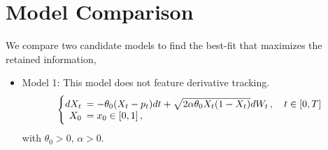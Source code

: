\documentclass[11pt]{article}
\theoremstyle{definition}
\begin{document}
\section{Model Comparison} \label{Section_5}

We compare two candidate models to find the best-fit that maximizes the retained information,
\begin{itemize}
  \item Model 1: This model does not feature derivative tracking.
\begin{equation}
  \left\{
  \begin{array}{@{}rl@{}}
    dX_t \!\!\!&=  - \theta_0 (X_t - p_t) dt +\sqrt{2 \alpha \theta_0 X_t (1 - X_t)} dW_t\,, \quad t \in [0,T]  \\
   X_0  \!\!\!&=  x_0\in [0,1] \,,
 \end{array}\right.  \label{Model1}
\end{equation}
 with $\theta_0 > 0, \, \alpha > 0$.

%  


\end{itemize}
\end{document}
